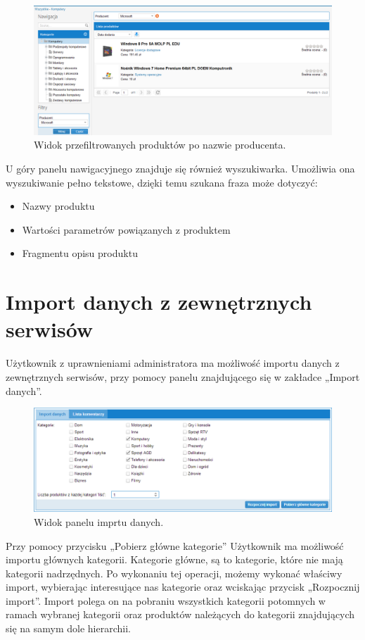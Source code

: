 \begin{figure}[h]
	\centering
	\includegraphics[width=1.00\textwidth]{images/po_nalozeniu_filtru_kategoria.png}
	\caption{Widok przefiltrowanych produktów po nazwie producenta.}
\end{figure}

\newpage

U góry panelu nawigacyjnego znajduje się również wyszukiwarka. Umożliwia ona wyszukiwanie pełno tekstowe, dzięki temu szukana fraza może dotyczyć:

\begin{itemize}
\item Nazwy produktu
\item Wartości parametrów powiązanych z produktem
\item Fragmentu opisu produktu
\end{itemize}

\section{Import danych z zewnętrznych serwisów}

Użytkownik z uprawnieniami administratora ma możliwość importu danych z zewnętrznych serwisów, przy pomocy panelu znajdującego się w zakładce „Import danych”.

\begin{figure}[h]
	\centering
	\includegraphics[width=1.00\textwidth]{images/Import.PNG}
	\caption{Widok panelu imprtu danych.}
\end{figure}

Przy pomocy przycisku „Pobierz główne kategorie” Użytkownik ma możliwość importu głównych kategorii. Kategorie główne, są to kategorie, które nie mają kategorii nadrzędnych. Po wykonaniu tej operacji, możemy wykonać właściwy import, wybierając interesujące nas kategorie oraz wciskając przycisk „Rozpocznij import”.\linebreak 
Import polega on na pobraniu wszystkich kategorii potomnych w ramach wybranej kategorii oraz produktów należących do kategorii znajdujących się na samym dole hierarchii.
